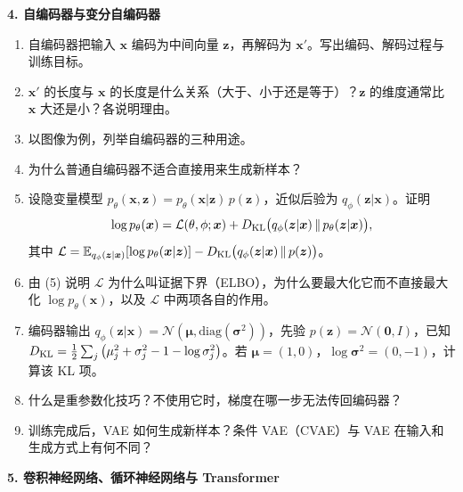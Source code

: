 \bigskip
\noindent\textbf{4. 自编码器与变分自编码器}
\begin{enumerate}[label=(\arabic*)]
\item 自编码器把输入 $\bm x$ 编码为中间向量 $\bm z$，再解码为 $\bm x'$。写出编码、解码过程与训练目标。
\item $\bm x'$ 的长度与 $\bm x$ 的长度是什么关系（大于、小于还是等于）？$\bm z$ 的维度通常比 $\bm x$ 大还是小？各说明理由。
\item 以图像为例，列举自编码器的三种用途。
\item 为什么普通自编码器不适合直接用来生成新样本？
\item 设隐变量模型 $p_\theta(\bm x,\bm z)=p_\theta(\bm x|\bm z)\,p(\bm z)$，近似后验为 $q_\phi(\bm z|\bm x)$。证明
\[
\log p_\theta(\bm x)=\mathcal L(\theta,\phi;\bm x)+D_{\mathrm{KL}}\big(q_\phi(\bm z|\bm x)\,\|\,p_\theta(\bm z|\bm x)\big),
\]
其中 $\mathcal L=\mathbb{E}_{q_\phi(\bm z|\bm x)}[\log p_\theta(\bm x|\bm z)]-D_{\mathrm{KL}}\big(q_\phi(\bm z|\bm x)\,\|\,p(\bm z)\big)$。
\item 由 (5) 说明 $\mathcal L$ 为什么叫证据下界（ELBO），为什么要最大化它而不直接最大化 $\log p_\theta(\bm x)$，以及 $\mathcal L$ 中两项各自的作用。
\item 编码器输出 $q_\phi(\bm z|\bm x)=\mathcal N(\bm\mu,\mathrm{diag}(\bm\sigma^2))$，先验 $p(\bm z)=\mathcal N(\bm 0,I)$，已知
$D_{\mathrm{KL}}=\frac12\sum_j\big(\mu_j^2+\sigma_j^2-1-\log\sigma_j^2\big)$。若 $\bm\mu=(1,0)$，$\log\bm\sigma^2=(0,-1)$，计算该 KL 项。
\item 什么是重参数化技巧？不使用它时，梯度在哪一步无法传回编码器？
\item 训练完成后，VAE 如何生成新样本？条件 VAE（CVAE）与 VAE 在输入和生成方式上有何不同？
\end{enumerate}

\bigskip
\noindent\textbf{5. 卷积神经网络、循环神经网络与 Transformer}

